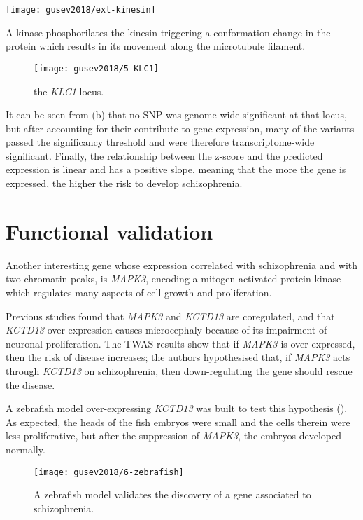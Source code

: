 \documentclass[../main.tex]{subfiles}
\begin{document}
\begin{marginfigure}[-8cm]
	\texttt{[image: gusev2018/ext-kinesin]}
	\caption{A kinase phosphorilates the kinesin triggering a 
conformation change in the protein which results in its movement along 
the microtubule filament.}
\end{marginfigure}

\begin{figure}
	\texttt{[image: gusev2018/5-KLC1]}
	\caption{the \textit{KLC1} locus.}
\end{figure}

It can be seen from (b) that no SNP was genome-wide significant at that 
locus, but after accounting for their contribute to gene expression, 
many of the variants passed the significancy threshold and were 
therefore transcriptome-wide significant. Finally, the relationship 
between the z-score and the predicted expression is linear and has a 
positive slope, meaning that the more the gene is expressed, the higher 
the risk to develop schizophrenia.

\section{Functional validation}

Another interesting gene whose expression correlated with schizophrenia 
and with two chromatin peaks, is \textit{MAPK3}, encoding a 
mitogen-activated protein kinase which regulates many aspects of cell 
growth and proliferation. 

Previous studies found that \textit{MAPK3} and \textit{KCTD13} are 
coregulated, and that \textit{KCTD13} over-expression causes 
microcephaly because of its impairment of neuronal proliferation. The 
TWAS results show that if \textit{MAPK3} is over-expressed, then the 
risk of disease increases; the authors hypothesised that, if 
\textit{MAPK3} acts through \textit{KCTD13} on schizophrenia, then 
down-regulating the gene should rescue the disease.

A zebrafish model over-expressing \textit{KCTD13} was built to test this 
hypothesis (). As expected, the heads of the fish 
embryos were small and the cells therein were less proliferative, but 
after the suppression of \textit{MAPK3}, the embryos developed normally.

\begin{figure}
	\texttt{[image: gusev2018/6-zebrafish]}
	\caption{A zebrafish model validates the discovery of a gene 
associated to schizophrenia.}
\end{figure}
\end{document}
